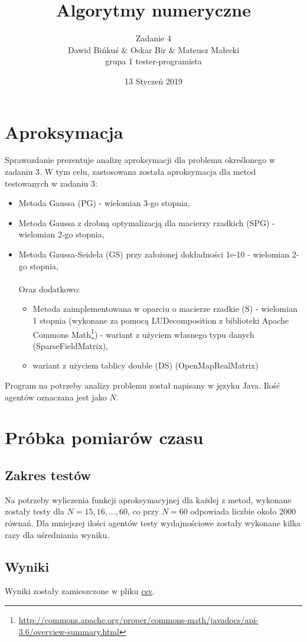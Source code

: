 \documentclass[10pt]{article}
\title{Algorytmy numeryczne}
\author{Zadanie 4 \\ Dawid Bińkuś \& Oskar Bir \& Mateusz Małecki\\grupa 1 tester-programista}
\date{13 Styczeń 2019}
\begin{document}
\maketitle 
\section{Aproksymacja}
Sprawozdanie prezentuje analizę aproksymacji dla problemu określonego w zadaniu 3.
W tym celu, zastosowana została aproksymacja dla metod testowanych w zadaniu 3:
\begin{itemize}
	\item Metoda Gaussa (PG) - wielomian 3-go stopnia,
	\item Metoda Gaussa z drobną optymalizacją dla macierzy rzadkich (SPG) - wielomian 2-go stopnia,
	\item Metoda Gaussa-Seidela (GS) przy założonej dokładności 1e-10 - wielomian 2-go stopnia,
	\\\\Oraz dodatkowo:
	\begin{itemize}
	\item Metoda zaimplementowana w oparciu o macierze rzadkie (S) - wielomian 1 stopnia (wykonane za pomocą LUDecomposition z biblioteki Apache Commons Math\footnote{\url{http://commons.apache.org/proper/commons-math/javadocs/api-3.6/overview-summary.html}}) - wariant z użyciem własnego typu danych (SparseFieldMatrix),
	\item wariant z użyciem tablicy double (DS) (OpenMapRealMatrix)
	\end{itemize}

\end{itemize}
Program na potrzeby analizy problemu został napisany w języku Java.
Ilość agentów oznaczana jest jako $N$.
\section{Próbka pomiarów czasu}
\subsection{Zakres testów}
Na potrzeby wyliczenia funkcji aproksymacyjnej dla każdej z metod, wykonane zostały testy dla $N = 15,16,...,60$, co przy $N = 60$ odpowiada liczbie około 2000 równań. Dla mniejszej ilości agentów testy wydajnościowe zostały wykonane kilka razy dla uśredniania wyniku.
\subsection{Wyniki}
Wyniki zostały zamieszczone w pliku \href{run:./files/wyniki.csv}{csv}.
\end{document}
